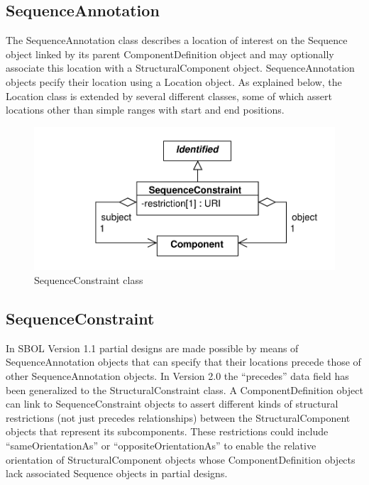 \documentclass[draftspec]{sbmlpkgspec}
\begin{document}
\subsection{SequenceAnnotation}

The SequenceAnnotation class describes a location of interest on the Sequence object linked by its parent ComponentDefinition object and may optionally associate this location with a StructuralComponent object. SequenceAnnotation objects pecify their location using a Location object. As explained below, the Location class is extended by several different classes, some of which assert locations other than simple ranges with start and end positions.

\begin{figure}[h]
\begin{center}
\includegraphics[width=\textwidth]{uml/sequence_constraint}
\caption[]{SequenceConstraint class}
\label{uml:sequence_constraint}
\end{center}
\end{figure}

\subsection{SequenceConstraint}

In SBOL Version 1.1 partial designs are made possible by means of SequenceAnnotation objects that can specify that their locations precede those of other SequenceAnnotation objects. In Version 2.0 the “precedes” data field has been generalized to the StructuralConstraint class. A ComponentDefinition object can link to SequenceConstraint objects to assert different kinds of structural restrictions (not just precedes relationships) between the StructuralComponent objects that represent its subcomponents. These restrictions could include “sameOrientationAs” or “oppositeOrientationAs” to enable the relative orientation of StructuralComponent objects whose ComponentDefinition objects lack associated Sequence objects in partial designs.
\end{document}
